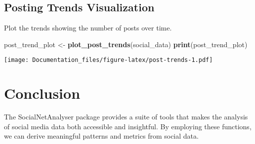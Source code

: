 \documentclass[
]{article}
\newenvironment{Shaded}{\begin{snugshade}}{\end{snugshade}}
\newcommand{\FunctionTok}[1]{\textcolor[rgb]{0.13,0.29,0.53}{\textbf{#1}}}
\newcommand{\NormalTok}[1]{#1}
\newcommand{\OtherTok}[1]{\textcolor[rgb]{0.56,0.35,0.01}{#1}}
\begin{document}
\hypertarget{posting-trends-visualization}{%
\subsection{Posting Trends
Visualization}\label{posting-trends-visualization}}

Plot the trends showing the number of posts over time.

\begin{Shaded}
\begin{Highlighting}[]
\NormalTok{post\_trend\_plot }\OtherTok{\textless{}{-}} \FunctionTok{plot\_post\_trends}\NormalTok{(social\_data)}
\FunctionTok{print}\NormalTok{(post\_trend\_plot)}
\end{Highlighting}
\end{Shaded}

\texttt{[image: Documentation\_files/figure-latex/post-trends-1.pdf]}

\hypertarget{conclusion}{%
\section{Conclusion}\label{conclusion}}

The SocialNetAnalyser package provides a suite of tools that makes the
analysis of social media data both accessible and insightful. By
employing these functions, we can derive meaningful patterns and metrics
from social data.
\end{document}
